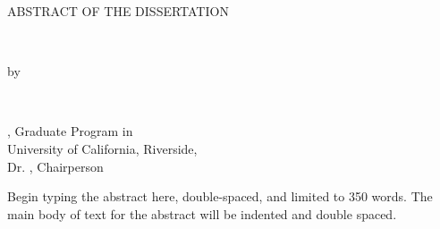 \begin{center}

        ABSTRACT OF THE DISSERTATION
        \\
        \vspace{24pt}

        \Title
        \\
        \vspace{12pt}

        by
        \\
        \vspace{12pt}

        \Author
        \\
        \vspace{24pt}

        \Degree, Graduate Program in \FieldofStudy \\
        University of California, Riverside, \ConferralDate \\
        Dr. \CommChair, Chairperson
        \\
        \vspace{24pt}
\end{center}

\doublespacing
\justifying

Begin typing the abstract here, double-spaced, and limited to 350 words.
The main body of text for the abstract will be indented and double spaced.

\lipsum[1]

